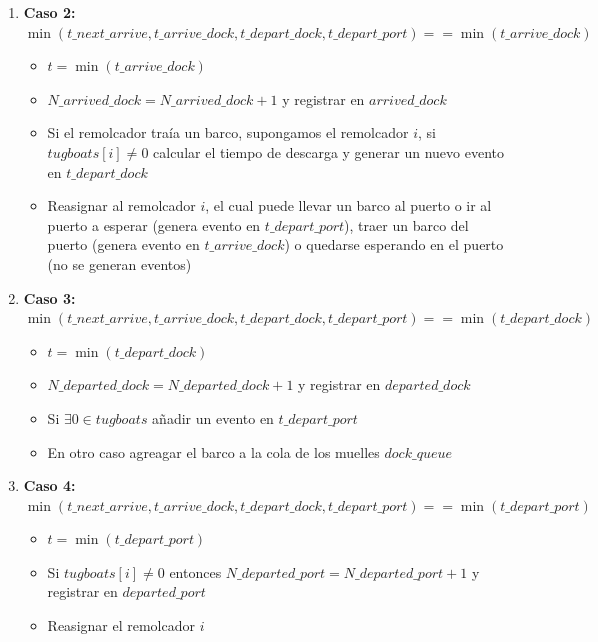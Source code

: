 \documentclass[titlepage,11pt]{scrartcl}
\begin{document}
\begin{enumerate}
        \item \textbf{Caso 2: $\min(t\_next\_arrive, t\_arrive\_dock, t\_depart\_dock, t\_depart\_port)  == \min(t\_arrive\_dock)$}
			\begin{itemize}
                \item $t = \min(t\_arrive\_dock)$
                \item $N\_arrived\_dock = N\_arrived\_dock + 1$ y registrar en $arrived\_dock$
                \item Si el remolcador tra\'ia un barco, supongamos el remolcador $i$, si $tugboats[i] \neq 0$ calcular el tiempo de descarga y generar un nuevo evento en $t\_depart\_dock$
                \item Reasignar al remolcador $i$, el cual puede llevar un barco al puerto o ir al puerto a esperar (genera evento en $t\_depart\_port$), traer un barco del puerto (genera evento en $t\_arrive\_dock$) o quedarse esperando en el puerto (no se generan eventos)   
			\end{itemize}

        \item \textbf{Caso 3: $\min(t\_next\_arrive, t\_arrive\_dock, t\_depart\_dock, t\_depart\_port)  == \min(t\_depart\_dock)$}
			\begin{itemize}
                \item $t = \min(t\_depart\_dock)$
                \item $N\_departed\_dock = N\_departed\_dock + 1$ y registrar en $departed\_dock$
                \item Si $\exists 0 \in tugboats$ a\~nadir un evento en $t\_depart\_port$
                \item En otro caso agreagar el barco a la cola de los muelles $dock\_queue$  
			\end{itemize}
        
        \item \textbf{Caso 4: $\min(t\_next\_arrive, t\_arrive\_dock, t\_depart\_dock, t\_depart\_port)  == \min(t\_depart\_port)$}
			\begin{itemize}
                \item $t = \min(t\_depart\_port)$
                \item Si $tugboats[i] \neq 0$ entonces $N\_departed\_port = N\_departed\_port + 1$ y registrar en $departed\_port$
                \item Reasignar el remolcador $i$ 
			\end{itemize}
	\end{enumerate}
\end{document}
